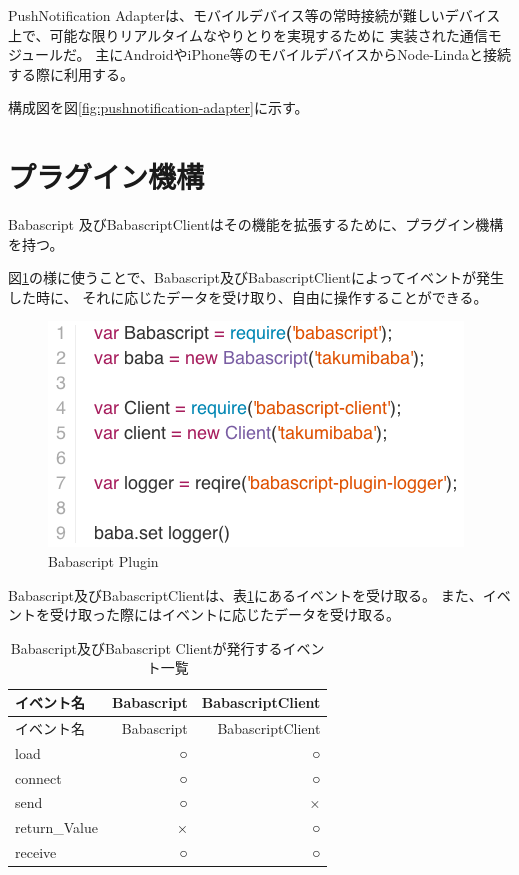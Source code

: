 PushNotification
Adapterは、モバイルデバイス等の常時接続が難しいデバイス上で、可能な限りリアルタイムなやりとりを実現するために
実装された通信モジュールだ。
主にAndroidやiPhone等のモバイルデバイスからNode-Lindaと接続する際に利用する。

構成図を図\ref{fig:pushnotification-adapter}に示す。

\section{プラグイン機構}\label{ux30d7ux30e9ux30b0ux30a4ux30f3ux6a5fux69cb}

Babascript
及びBabascriptClientはその機能を拡張するために、プラグイン機構を持つ。

図\ref{fig:babascript_plugin}の様に使うことで、Babascript及びBabascriptClientによってイベントが発生した時に、
それに応じたデータを受け取り、自由に操作することができる。

\begin{figure}[htbp]
  \begin{center}
  \includegraphics[width=.7\linewidth,bb=0 0 416 226]{images/babascript_plugin.js.png}
  \end{center}
  \caption{Babascript Plugin}
  \label{fig:babascript_plugin}
\end{figure}

Babascript及びBabascriptClientは、表\ref{table:plugin-events}にあるイベントを受け取る。
また、イベントを受け取った際にはイベントに応じたデータを受け取る。

\begin{longtable}[c]{@{}lrr@{}}
\caption{Babascript及びBabascript Clientが発行するイベント一覧
\label{table:plugin-events}}\tabularnewline
\toprule
イベント名 & Babascript & BabascriptClient\tabularnewline
\midrule
\endfirsthead
\toprule
イベント名 & Babascript & BabascriptClient\tabularnewline
\midrule
\endhead
load & ○ & ○\tabularnewline
connect & ○ & ○\tabularnewline
send & ○ & ×\tabularnewline
return\_Value & × & ○\tabularnewline
receive & ○ & ○\tabularnewline
\bottomrule
\end{longtable}

